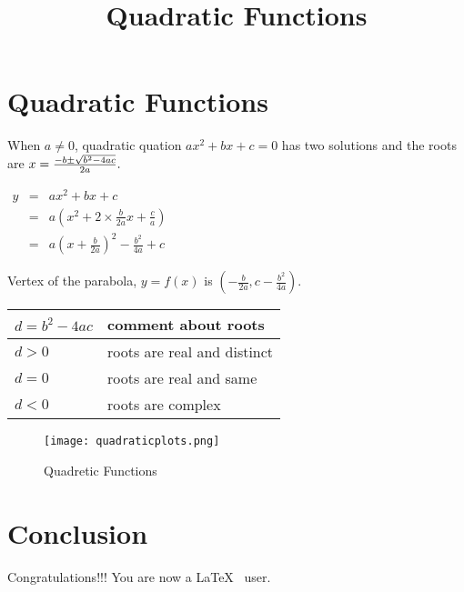 \documentclass{article}
\title{Quadratic Functions}
\begin{document}
\maketitle

\section{Quadratic Functions}
When $a \ne 0$, quadratic quation $ax^2 + bx + c = 0$ has two solutions and the roots are
$x = {-b \pm \sqrt{b^2-4ac} \over 2a}.$ 

$ \begin{array}{rcl}
y & = & a x^{2}+bx+c\\
  & = & a\left(x^{2}+2\times\frac{b}{2a}x+\frac{c}{a}\right)\\
  & = & a\left(x+\frac{b}{2a}\right)^2 - \frac{b^2}{4a} + c
\end{array} $ 

Vertex of the parabola, $y = f(x)$ is $\left(-\frac{b}{2a}, c - \frac{b^2}{4a}\right)$.

\begin{center}
\begin{tabular}{|l|l|}
\hline
 $d = b^2 - 4ac$ & comment about roots \\ 
 \hline
 $d>0$ & roots are real and distinct \\  
 \hline
 $d = 0$ & roots are real and same \\
 \hline
 $d<0$ & roots are complex \\
\hline
\end{tabular}
\end{center}

\begin{figure}[h!]
\centering
\texttt{[image: quadraticplots.png]}
\caption{Quadretic Functions}
\label{fig:quadretic}
\end{figure}

\section{Conclusion}
Congratulations!!! You are now a \LaTeX~ user.
\end{document}
